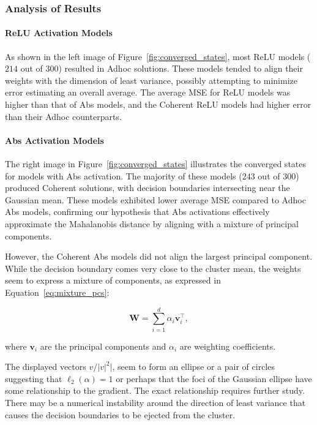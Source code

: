 \subsubsection{Analysis of Results}

\paragraph{ReLU Activation Models}

As shown in the left image of Figure~\ref{fig:converged_states}, most ReLU models ($214$ out of $300$) resulted in Adhoc solutions. These models tended to align their weights with the dimension of least variance, possibly attempting to minimize error estimating an overall average. The average MSE for ReLU models was higher than that of Abs models, and the Coherent ReLU models had higher error than their Adhoc counterparts.

\paragraph{Abs Activation Models}

The right image in Figure~\ref{fig:converged_states} illustrates the converged states for models with Abs activation. The majority of these models ($243$ out of $300$) produced Coherent solutions, with decision boundaries intersecting near the Gaussian mean. These models exhibited lower average MSE compared to Adhoc Abs models, confirming our hypothesis that Abs activations effectively approximate the Mahalanobis distance by aligning with a mixture of principal components.

However, the Coherent Abs models did not align the largest principal component. While the decision boundary comes very close to the cluster mean, the weights seem to express a mixture of components, as expressed in Equation~\eqref{eq:mixture_pcs}:

\begin{equation} \label{eq:mixture_pcs} \mathbf{W} = \sum_{i=1}^d \alpha_i \mathbf{v}_i^\top, \end{equation}

where $\mathbf{v}_i$ are the principal components and $\alpha_i$ are weighting coefficients. 

The displayed vectors $v / |v|^2|$, seem to form an ellipse or a pair of circles suggesting that $\ell_2(\alpha)=1$ or perhaps that the foci of the Gaussian ellipse have some relationship to the gradient. The exact relationship requires further study. There may be a numerical instability around the direction of least variance that causes the decision boundaries to be ejected from the cluster.

